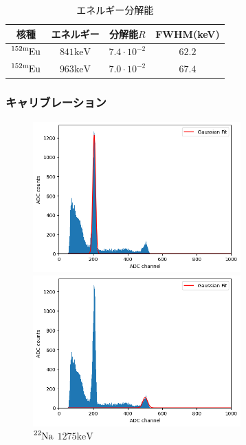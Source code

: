 \documentclass[dvipdfmx]{jreport}
\begin{document}
\begin{table}[hbtp]
  \caption{エネルギー分解能 \label{resolution}}
  \centering
  \begin{tabular}{cccc}
    \hline
    核種 & エネルギー & 分解能$R$ & FWHM(keV)\\
    \hline \hline
    $\ce{^{152\mathrm{m}}Eu}$ & $841\mathrm{keV}$ & $7.4\cdot10^{-2}$ & $62.2$\\
    $\ce{^{152\mathrm{m}}Eu}$ & $963\mathrm{keV}$ & $7.0\cdot10^{-2}$ & $67.4$\\
    \hline
  \end{tabular}
\end{table}

\subsubsection{キャリブレーション}
\begin{figure}[htbp]
  \begin{minipage}[b]{0.45\linewidth}
    \centering
    \includegraphics[width=80mm]{figure/Na22_10min_511.png}
    \caption{$\ce{^{22}Na}$ $511\mathrm{keV}$ \label{511}}
  \end{minipage}
  \begin{minipage}[b]{0.45\linewidth}
    \centering
    \includegraphics[width=80mm]{figure/Na22_10min_1275.png}
    \caption{$\ce{^{22}Na}$ $1275\mathrm{keV}$ \label{1275}}
  \end{minipage}
\end{figure}
\end{document}
